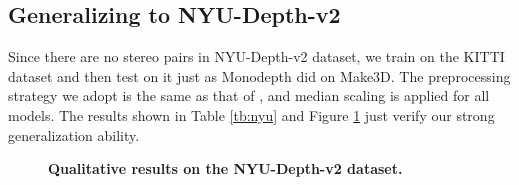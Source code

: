 \documentclass[10pt,twocolumn,letterpaper]{article}
\begin{document}
\subsection{Generalizing to NYU-Depth-v2}

Since there are no stereo pairs in NYU-Depth-v2 dataset, we train on the KITTI dataset 
and then test on it just as Monodepth \cite{Godard2017} did on Make3D. The preprocessing 
strategy we adopt 
is the same as that of \cite{Yu2020}, and median scaling is applied for all models. The 
results shown in Table \ref{tb:nyu} and Figure \ref{fig:nyu} just verify our strong 
generalization ability. 

\begin{figure}[t]
   \begin{center}
   \end{center}
   \vspace{-0.2cm}
   \caption{{\bf Qualitative results on the NYU-Depth-v2 dataset.}}
   \label{fig:nyu}
\end{figure}

\begin{table}[t]
\begin{center}
   \end{center}
\caption{{\bf Quantitative results on the NYU-Depth-v2 dataset.}}
   \label{tb:nyu}
   \vspace{-0.2cm}
\end{table}
\end{document}
